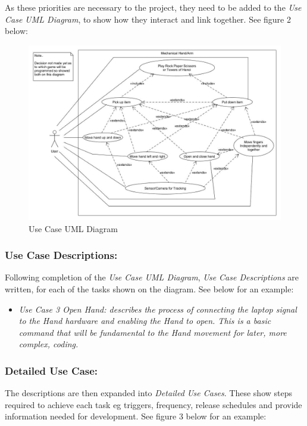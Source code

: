 \documentclass[progress]{cmpreport}
\begin{document}
As these priorities are necessary to the project, they need to be added to the \textit{Use Case UML Diagram}, to show how they interact and link together. See figure 2 below: 

\begin{figure}[H] 
	\caption{Use Case UML Diagram }
	\centering
	\includegraphics[width=0.8 \textwidth, height=0.535 \textheight]{photos/UMLdiagram.jpg}
\end{figure}

\subsubsection{Use Case Descriptions:}

Following completion of the \textit{Use Case UML Diagram}, \textit{Use Case Descriptions} are written, for each of the tasks shown on the diagram. See below for an example:

\begin{itemize}		
	\item \textit{Use Case 3 Open Hand: describes the process of connecting the laptop signal to the Hand hardware and enabling the Hand to open. This is a basic command that will be fundamental to the Hand movement for later, more complex, coding.}
\end{itemize}

\subsubsection{Detailed Use Case:}

The descriptions are then expanded into \textit{Detailed Use Cases}. These show steps required to achieve each task eg triggers, frequency, release schedules and provide information needed for development. See figure 3 below for an example:
\end{document}
